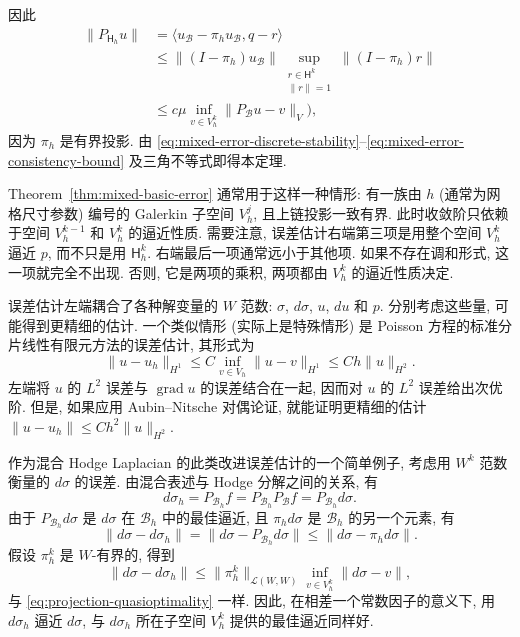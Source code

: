 \begin{Proof}
\[\]
因此
\begin{equation}\label{eq:mixed-error-consistency-bound}
\begin{aligned}
\|P_{\mathsf H_h}u\|&=\langle u_{\mathcal B}-\pi_hu_{\mathcal B},q-r\rangle\\
&\leq\|(I-\pi_h)u_{\mathcal B}\|\sup_{\substack{r\in\mathsf H^k\\\|r\|=1}}\|(I-\pi_h)r\|\\
&\leq c\mu\inf_{v\in V_h^k}\|P_{\mathcal B}u-v\|_V),
\end{aligned}
\end{equation}
因为 $\pi_h$ 是有界投影. 由 \eqref{eq:mixed-error-discrete-stability}--\eqref{eq:mixed-error-consistency-bound} 及三角不等式即得本定理.
\end{Proof}

Theorem~\ref{thm:mixed-basic-error} 通常用于这样一种情形: 有一族由 $h$ (通常为网格尺寸参数) 编号的 Galerkin 子空间 $V_h^j$, 且上链投影一致有界. 此时收敛阶只依赖于空间 $V_h^{k-1}$ 和 $V_h^k$ 的逼近性质. 需要注意, 误差估计右端第三项是用整个空间 $V_h^k$ 逼近 $p$, 而不只是用 $\mathsf H_h^k$. 右端最后一项通常远小于其他项. 如果不存在调和形式, 这一项就完全不出现. 否则, 它是两项的乘积, 两项都由 $V_h^k$ 的逼近性质决定.

误差估计左端耦合了各种解变量的 $W$ 范数: $\sigma$, $d\sigma$, $u$, $du$ 和 $p$. 分别考虑这些量, 可能得到更精细的估计. 一个类似情形 (实际上是特殊情形) 是 Poisson 方程的标准分片线性有限元方法的误差估计, 其形式为
\[
\|u-u_h\|_{H^1}\leq C\inf_{v\in V_h}\|u-v\|_{H^1}\leq Ch\|u\|_{H^2}.
\]
左端将 $u$ 的 $L^2$ 误差与 $\operatorname{grad}u$ 的误差结合在一起, 因而对 $u$ 的 $L^2$ 误差给出次优阶. 但是, 如果应用 Aubin–Nitsche 对偶论证, 就能证明更精细的估计 $\|u-u_h\|\leq Ch^2\|u\|_{H^2}$.

作为混合 Hodge Laplacian 的此类改进误差估计的一个简单例子, 考虑用 $W^k$ 范数衡量的 $d\sigma$ 的误差. 由混合表述与 Hodge 分解之间的关系, 有
\[
d\sigma_h=P_{\mathcal B_h}f=P_{\mathcal B_h}P_{\mathcal B}f=P_{\mathcal B_h}d\sigma.
\]
由于 $P_{\mathcal B_h}d\sigma$ 是 $d\sigma$ 在 $\mathcal B_h$ 中的最佳逼近, 且 $\pi_hd\sigma$ 是 $\mathcal B_h$ 的另一个元素, 有
\[
\|d\sigma-d\sigma_h\|=\|d\sigma-P_{\mathcal B_h}d\sigma\|\leq\|d\sigma-\pi_hd\sigma\|.
\]
假设 $\pi_h^k$ 是 $W$-有界的, 得到
\[
\|d\sigma-d\sigma_h\|\leq\|\pi_h^k\|_{\mathcal L(W,W)}\inf_{v\in V_h^k}\|d\sigma-v\|,
\]
与 \eqref{eq:projection-quasioptimality} 一样. 因此, 在相差一个常数因子的意义下, 用 $d\sigma_h$ 逼近 $d\sigma$, 与 $d\sigma_h$ 所在子空间 $V_h^k$ 提供的最佳逼近同样好.

